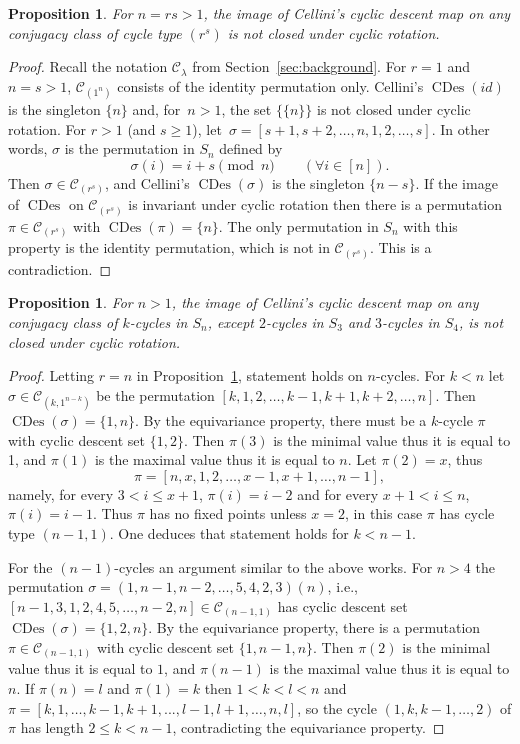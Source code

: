 \documentclass[10pt]{article}
\newtheorem{proposition}[theorem]{Proposition}
\theoremstyle{definition}
\newcommand{\C}{\mathcal C}
\DeclareMathOperator\CDes{CDes}
\begin{document}
\begin{proposition}\label{prop:Cel1}
	For $n = rs > 1$, the image of Cellini's cyclic descent map on any conjugacy class of cycle type $(r^s)$ is not closed under cyclic rotation.
\end{proposition}
	
\begin{proof}
	Recall the notation $\C_\lambda$ from Section~\ref{sec:background}.
	For $r=1$ and $n = s > 1$, $\C_{(1^n)}$ consists of the identity permutation only. Cellini's $\CDes(id)$ is the singleton $\{n\}$ and, for~$n > 1$, the set $\{\{n\}\}$ is not closed under cyclic rotation.
	For $r>1$ (and $s \ge 1$), 
    let~$\sigma = [s+1,s+2,\dots,n,1,2,\dots,s]$.
    In other words, $\sigma$ is the permutation in $S_n$ defined by 
	\[
		\sigma(i) = i+s \pmod{n} \qquad (\forall i\in [n]).
	\]
	Then $\sigma \in \C_{(r^s)}$, 
    and Cellini's $\CDes(\sigma)$ is the singleton $\{n-s\}$. 
    If the image of $\CDes$ on $\C_{(r^s)}$ is invariant under cyclic rotation then there is a permutation $\pi \in \C_{(r^s)}$ with $\CDes(\pi) = \{n\}$. The only permutation in $S_n$ with this property is the identity permutation, which is not in $\C_{(r^s)}$. This is a contradiction.
\end{proof}
	
\begin{proposition}
	For $n > 1$, the image of Cellini's cyclic descent map on any conjugacy class of $k$-cycles in $S_n$, except $2$-cycles in $S_3$ and $3$-cycles in $S_4$, is not closed under cyclic rotation.
\end{proposition}
	
\begin{proof}
	Letting $r=n$ in Proposition~\ref{prop:Cel1}, statement holds on $n$-cycles.
	For $k<n$ let $\sigma\in \C_{(k,1^{n-k})}$ be the permutation $[k,1,2,\dots,k-1,k+1,k+2,\dots,n]$. Then $\CDes(\sigma)=\{1,n\}$.
	By the equivariance property,  there must be a $k$-cycle $\pi$ with cyclic descent set $\{1,2\}$. Then $\pi(3)$ is the minimal value thus it is equal to 1, and $\pi(1)$
	is the maximal value thus it is equal to $n$. Let $\pi(2)=x$, thus
	\[
		\pi=[n,x,1,2,\dots,x-1,x+1,\dots,n-1],
	\]
	namely, for every $3<i\le x+1$, $\pi(i)=i-2$ and for every $x+1<i\le n$, $\pi(i)=i-1$. Thus $\pi$ has no fixed points unless $x=2$, in this case $\pi$
	has cycle type $(n-1,1)$.  One deduces that statement holds for $k<n-1$.
		
	For the $(n-1)$-cycles an argument similar to the above works. For $n>4$ the permutation $\sigma=(1,n-1,n-2,\ldots,5,4,2,3)(n)$, i.e., $[n-1,3,1,2,4,5,\ldots,n-2,n]\in \C_{(n-1,1)}$ has cyclic descent set $\CDes(\sigma)=\{1,2,n\}$. 
	By the equivariance property, there is a permutation $\pi\in \C_{(n-1,1)}$ with cyclic descent set $\{1,n-1,n\}$. Then $\pi(2)$ is the minimal value thus it is equal to $1$, and $\pi(n-1)$ is the maximal value thus it is equal to $n$. If $\pi(n)=l$ and $\pi(1)=k$ then $1<k<l<n$ and $\pi=[k,1,\dots,k-1,k+1,...,l-1,l+1,\dots,n,l]$, 
	so the cycle $(1,k,k-1,\ldots,2)$ of $\pi$ has length $2\le k<n-1$,  
	contradicting the equivariance property.
\end{proof}
\end{document}
